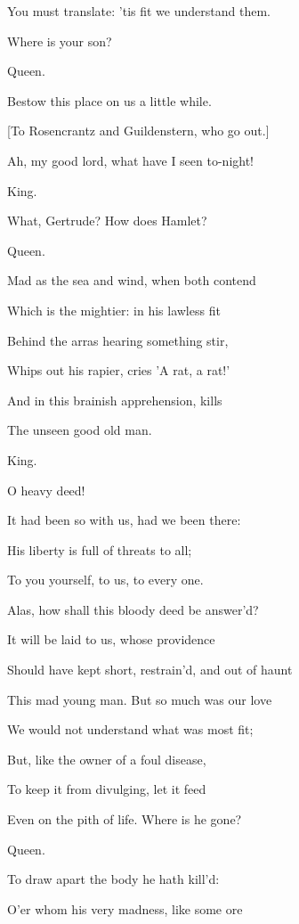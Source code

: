 \documentclass[12pt]{book}
\begin{document}
You must translate: 'tis fit we understand them.

Where is your son?



Queen.

Bestow this place on us a little while.



[To Rosencrantz and Guildenstern, who go out.]



Ah, my good lord, what have I seen to-night!



King.

What, Gertrude? How does Hamlet?



Queen.

Mad as the sea and wind, when both contend

Which is the mightier: in his lawless fit

Behind the arras hearing something stir,

Whips out his rapier, cries 'A rat, a rat!'

And in this brainish apprehension, kills

The unseen good old man.



King.

O heavy deed!

It had been so with us, had we been there:

His liberty is full of threats to all;

To you yourself, to us, to every one.

Alas, how shall this bloody deed be answer'd?

It will be laid to us, whose providence

Should have kept short, restrain'd, and out of haunt

This mad young man. But so much was our love

We would not understand what was most fit;

But, like the owner of a foul disease,

To keep it from divulging, let it feed

Even on the pith of life. Where is he gone?



Queen.

To draw apart the body he hath kill'd:

O'er whom his very madness, like some ore
\end{document}
